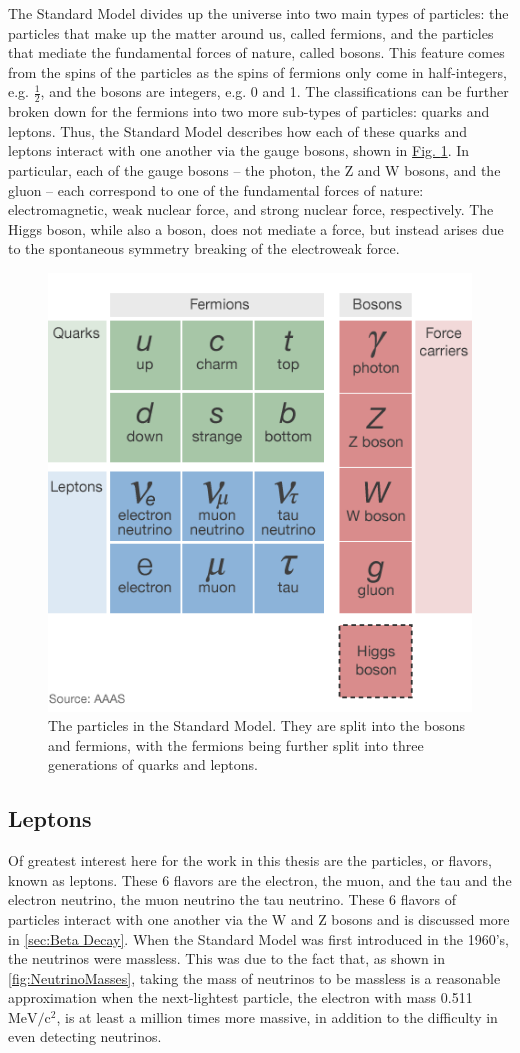 The Standard Model divides up the universe into two main types of particles: the particles that make up the matter around us, called fermions, and the particles that mediate the fundamental forces of nature, called bosons. This feature comes from the spins of the particles as the spins of fermions only come in half-integers, e.g. $\frac{1}{2}$, and the bosons are integers, e.g. 0 and 1. The classifications can be further broken down for the fermions into two more sub-types of particles: quarks and leptons. Thus, the Standard Model describes how each of these quarks and leptons interact with one another via the gauge bosons, shown in \hyperref[fig:StandardModel]{Fig. \ref*{fig:StandardModel}}. In particular, each of the gauge bosons -- the photon, the Z and W bosons, and the gluon -- each correspond to one of the fundamental forces of nature: electromagnetic, weak nuclear force, and strong nuclear force, respectively. The Higgs boson, while also a boson, does not mediate a force, but instead arises due to the spontaneous symmetry breaking of the electroweak force. 

\begin{figure}[tbph]
\centering
\includegraphics[width=0.6\linewidth]{Figures/higgs-elementary-particles.png}
\caption[The particles in the Standard Model]{The particles in the Standard Model. They are split into the bosons and fermions, with the fermions being further split into three generations of quarks and leptons.}
\label{fig:StandardModel}
\end{figure}

\subsection{Leptons}
Of greatest interest here for the work in this thesis are the particles, or flavors, known as leptons. These 6 flavors are the electron, the muon, and the tau and the electron neutrino, the muon neutrino the tau neutrino. These 6 flavors of particles interact with one another via the W and Z bosons and is discussed more in \autoref{sec:Beta Decay}. When the Standard Model was first introduced in the 1960's, the neutrinos were massless. This was due to the fact that, as shown in \autoref{fig:NeutrinoMasses}, taking the mass of neutrinos to be massless is a reasonable approximation when the next-lightest particle, the electron with mass 0.511 $\textrm{MeV}/\textrm{c}^2$, is at least a million times more massive, in addition to the difficulty in even detecting neutrinos.


